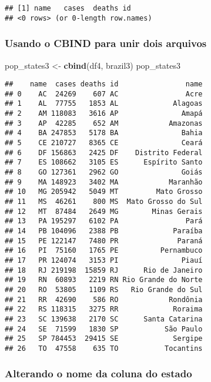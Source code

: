 \documentclass[
]{article}
\newenvironment{Shaded}{\begin{snugshade}}{\end{snugshade}}
\newcommand{\KeywordTok}[1]{\textcolor[rgb]{0.13,0.29,0.53}{\textbf{#1}}}
\newcommand{\NormalTok}[1]{#1}
\newcommand{\StringTok}[1]{\textcolor[rgb]{0.31,0.60,0.02}{#1}}
\begin{document}
\begin{verbatim}
## [1] name   cases  deaths id    
## <0 rows> (or 0-length row.names)
\end{verbatim}

\hypertarget{usando-o-cbind-para-unir-dois-arquivos}{%
\subsubsection{Usando o CBIND para unir dois
arquivos}\label{usando-o-cbind-para-unir-dois-arquivos}}

\begin{Shaded}
\begin{Highlighting}[]
\NormalTok{pop\_states3 \textless{}{-}}\StringTok{ }\KeywordTok{cbind}\NormalTok{(df4, brazil3)}
\NormalTok{pop\_states3}
\end{Highlighting}
\end{Shaded}

\begin{verbatim}
##    name  cases deaths id                name
## 0    AC  24269    607 AC                Acre
## 1    AL  77755   1853 AL             Alagoas
## 2    AM 118083   3616 AP               Amapá
## 3    AP  42285    652 AM            Amazonas
## 4    BA 247853   5178 BA               Bahia
## 5    CE 210727   8365 CE               Ceará
## 6    DF 156863   2425 DF    Distrito Federal
## 7    ES 108662   3105 ES      Espírito Santo
## 8    GO 127361   2962 GO               Goiás
## 9    MA 148923   3402 MA            Maranhão
## 10   MG 205942   5049 MT         Mato Grosso
## 11   MS  46261    800 MS  Mato Grosso do Sul
## 12   MT  87484   2649 MG        Minas Gerais
## 13   PA 195297   6102 PA                Pará
## 14   PB 104096   2388 PB             Paraíba
## 15   PE 122147   7480 PR              Paraná
## 16   PI  75160   1765 PE          Pernambuco
## 17   PR 124074   3153 PI               Piauí
## 18   RJ 219198  15859 RJ      Rio de Janeiro
## 19   RN  60893   2219 RN Rio Grande do Norte
## 20   RO  53805   1109 RS   Rio Grande do Sul
## 21   RR  42690    586 RO            Rondônia
## 22   RS 118315   3275 RR             Roraima
## 23   SC 139638   2170 SC      Santa Catarina
## 24   SE  71599   1830 SP           São Paulo
## 25   SP 784453  29415 SE             Sergipe
## 26   TO  47558    635 TO           Tocantins
\end{verbatim}

\hypertarget{alterando-o-nome-da-coluna-do-estado}{%
\subsubsection{Alterando o nome da coluna do
estado}\label{alterando-o-nome-da-coluna-do-estado}}
\end{document}
